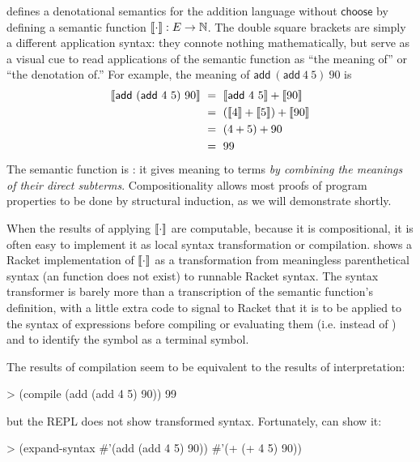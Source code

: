  defines a denotational semantics for the addition language without $\mathsf{choose}$ by defining a semantic function $\left\llbracket{\cdot}\right\rrbracket : E \to \mathbb{N}$.
The double square brackets are simply a different application syntax: they connote nothing mathematically, but serve as a visual cue to read applications of the semantic function as ``the meaning of'' or ``the denotation of.''
For example, the meaning of $\mathsf{add}~(\mathsf{add}~4~5)~90$ is
\begin{equation}
\begin{aligned}
	\left\llbracket{\mathsf{add}~(\mathsf{add}~4~5)~90}\right\rrbracket
	&\ =\ \left\llbracket{\mathsf{add}~4~5}\right\rrbracket + \left\llbracket{90}\right\rrbracket
\\
	&\ =\ (\left\llbracket{4}\right\rrbracket + \left\llbracket{5}\right\rrbracket) + \left\llbracket{90}\right\rrbracket
\\
	&\ =\ (4 + 5) + 90
\\
	&\ =\ 99
\end{aligned}
\end{equation}
The semantic function is : it gives meaning to terms \emph{by combining the meanings of their direct subterms}.
Compositionality allows most proofs of program properties to be done by structural induction, as we will demonstrate shortly.

When the results of applying $\left\llbracket{\cdot}\right\rrbracket$ are computable, because it is compositional, it is often easy to implement it as local syntax transformation or compilation.
 shows a Racket implementation of $\left\llbracket{\cdot}\right\rrbracket$ as a transformation from meaningless parenthetical syntax (an  function does not exist) to runnable Racket syntax.
The syntax transformer is barely more than a transcription of the semantic function's definition, with a little extra code to signal to Racket that it is to be applied to the syntax of expressions before compiling or evaluating them (i.e.  instead of ) and to identify the symbol  as a terminal symbol.

The results of compilation seem to be equivalent to the results of interpretation:
\begin{center}
\singlespacing
\begin{schemedisplay}
> (compile (add (add 4 5) 90))
99
\end{schemedisplay}
\end{center}
but the REPL does not show transformed syntax.
Fortunately,  can show it:
\begin{center}
\singlespacing
\begin{schemedisplay}
> (expand-syntax #'(add (add 4 5) 90))
#'(+ (+ 4 5) 90))
\end{schemedisplay}
\end{center}


